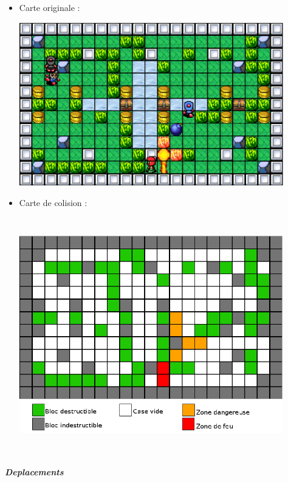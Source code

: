 				\begin{itemize}
				  \item Carte originale :
				  
						\begin{center}						
							\includegraphics[width=115mm,height=71mm]{Developpement/Img/mapcolision_1.eps}
						\end{center}				  		
				  
				  \item Carte de colision :
				  
						\begin{center}						
							\includegraphics[width=115mm,height=102mm]{Developpement/Img/mapcolision_2.eps}
						\end{center}
						
				\end{itemize}
		

			\subparagraph{Deplacements\\}
			
